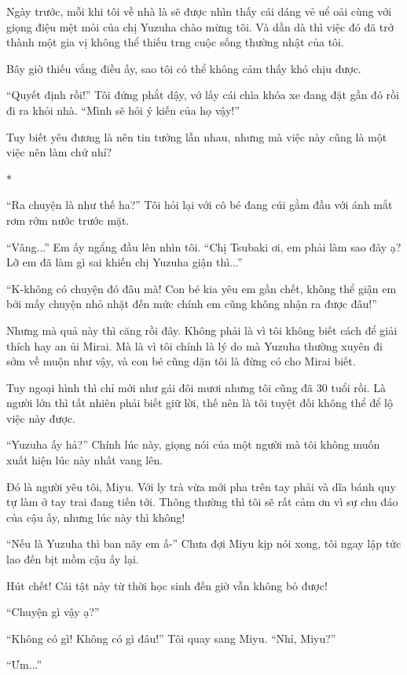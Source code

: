 {Ngày trước, mỗi khi tôi về nhà là sẽ được nhìn thấy cái dáng vẻ uể oải
cùng với giọng điệu mệt mỏi của chị Yuzuha chào mừng tôi. Và dần dà thì
việc đó đã trở thành một gia vị không thể thiếu trng cuộc sống thường
nhật của tôi.

Bây giờ thiếu vắng điều ấy, sao tôi có thể không cảm thấy khó chịu được.

``Quyết định rồi!'' Tôi đứng phắt dậy, vớ lấy cái chìa khóa xe đang đặt
gần đó rồi đi ra khỏi nhà. ``Mình sẽ hỏi ý kiến của họ vậy!''

Tuy biết yêu đương là nên tin tưởng lẫn nhau, nhưng mà việc này cũng là
một việc nên làm chứ nhỉ?

*

``Ra chuyện là như thế ha?'' Tôi hỏi lại với cô bé đang cúi gằm đầu với
ánh mắt rơm rớm nước trước mặt.

``Vâng...'' Em ấy ngẩng đầu lên nhìn tôi. ``Chị Tsubaki ơi, em phải làm
sao đây ạ? Lỡ em đã làm gì sai khiến chị Yuzuha giận thì...''

``K-không có chuyện đó đâu mà! Con bé kia yêu em gần chết, không thể
giận em bởi mấy chuyện nhỏ nhặt đến mức chính em cũng không nhận ra được
đâu!''

Nhưng mà quả này thì căng rồi đây. Không phải là vì tôi không biết cách
để giải thích hay an ủi Mirai. Mà là vì tôi chính là lý do mà Yuzuha
thường xuyên đi sớm về muộn như vậy, và con bé cũng dặn tôi là đừng có
cho Mirai biết.

Tuy ngoại hình thì chỉ mới như gái đôi mươi nhưng tôi cũng đã 30 tuổi
rồi. Là người lớn thì tất nhiên phải biết giữ lời, thế nên là tôi tuyệt
đối không thể để lộ việc này được.

``Yuzuha ấy hả?'' Chính lúc này, giọng nói của một người mà tôi không
muốn xuất hiện lúc này nhất vang lên.

Đó là người yêu tôi, Miyu. Với ly trà vừa mới pha trên tay phải và dĩa
bánh quy tự làm ở tay trai đang tiến tới. Thông thường thì tôi sẽ rất
cảm ơn vì sự chu đáo của cậu ấy, nhưng lúc này thì không!

``Nếu là Yuzuha thì ban nãy em ấ-'' Chưa đợi Miyu kịp nói xong, tôi ngay
lập tức lao đến bịt mồm cậu ấy lại.

Hút chết! Cái tật này từ thời học sinh đến giờ vẫn không bỏ được!

``Chuyện gì vậy ạ?''

``Không có gì! Không có gì đâu!'' Tôi quay sang Miyu. ``Nhỉ, Miyu?''

``Ưm...''

}
